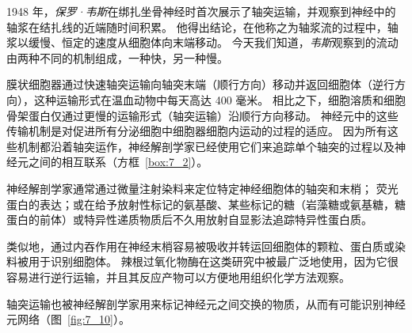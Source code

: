 1948 年，\textit{保罗·韦斯}在绑扎坐骨神经时首次展示了轴突运输，并观察到神经中的轴浆在结扎线的近端随时间积累。
他得出结论，在他称之为轴浆流的过程中，轴浆以缓慢、恒定的速度从细胞体向末端移动。
今天我们知道，\textit{韦斯}观察到的流动由两种不同的机制组成，一种快，另一种慢。


膜状细胞器通过快速轴突运输向轴突末端（顺行方向）移动并返回细胞体（逆行方向），这种运输形式在温血动物中每天高达 400 毫米。
相比之下，细胞溶质和细胞骨架蛋白仅通过更慢的运输形式（轴突运输）沿顺行方向移动。
神经元中的这些传输机制是对促进所有分泌细胞中细胞器细胞内运动的过程的适应。
因为所有这些机制都沿着轴突运作，神经解剖学家已经使用它们来追踪单个轴突的过程以及神经元之间的相互联系（方框~\ref{box:7_2}）。

\begin{proposition}[神经解剖学追踪利用轴突运输] \label{box:7_2}
	
	\quad \quad 神经解剖学家通常通过微量注射染料来定位特定神经细胞体的轴突和末梢；
	荧光蛋白的表达；或在给予放射性标记的氨基酸、某些标记的糖（岩藻糖或氨基糖，糖蛋白的前体）或特异性递质物质后不久用放射自显影法追踪特异性蛋白质。
	
	\quad \quad 类似地，通过内吞作用在神经末梢容易被吸收并转运回细胞体的颗粒、蛋白质或染料被用于识别细胞体。
	辣根过氧化物酶在这类研究中被最广泛地使用，因为它很容易进行逆行运输，并且其反应产物可以方便地用组织化学方法观察。
	
	\quad \quad 轴突运输也被神经解剖学家用来标记神经元之间交换的物质，从而有可能识别神经元网络（图~\ref{fig:7_10}）。
	
\end{proposition}


